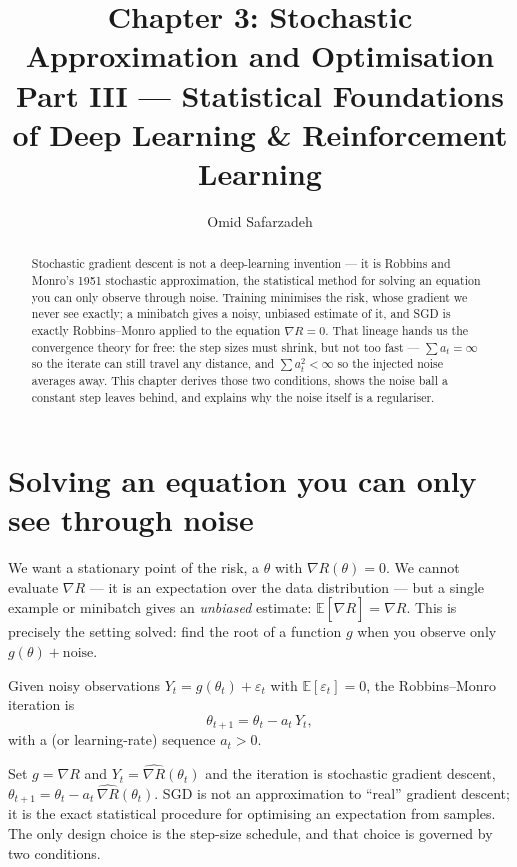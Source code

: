 \documentclass[11pt]{article}
\title{Chapter 3: Stochastic Approximation and Optimisation \\ \large Part III --- Statistical Foundations of Deep Learning \& Reinforcement Learning}
\author{Omid Safarzadeh}
\date{}
\begin{document}
\maketitle

\begin{abstract}
\noindent
Stochastic gradient descent is not a deep-learning invention --- it is Robbins
and Monro's 1951 stochastic approximation, the statistical method for solving an
equation you can only observe through noise. Training minimises the risk, whose
gradient we never see exactly; a minibatch gives a noisy, unbiased estimate of
it, and SGD is exactly Robbins--Monro applied to the equation $\nabla R=0$. That
lineage hands us the convergence theory for free: the step sizes must shrink,
but not too fast --- $\sum a_t=\infty$ so the iterate can still travel any
distance, and $\sum a_t^2<\infty$ so the injected noise averages away. This
chapter derives those two conditions, shows the noise ball a constant step
leaves behind, and explains why the noise itself is a regulariser.
\end{abstract}

\tableofcontents

\section{Solving an equation you can only see through noise}

We want a stationary point of the risk, a $\theta$ with $\nabla R(\theta)=0$.
We cannot evaluate $\nabla R$ --- it is an expectation over the data
distribution --- but a single example or minibatch gives an \emph{unbiased}
estimate: $\mathbb{E}[\widehat{\nabla R}] = \nabla R$. This is precisely the
setting  solved: find the root of a function $g$ when you
observe only $g(\theta)+\text{noise}$.

\begin{definition}
Given noisy observations $Y_t = g(\theta_t) + \varepsilon_t$ with
$\mathbb{E}[\varepsilon_t]=0$, the Robbins--Monro iteration is
\[
  \theta_{t+1} = \theta_t - a_t\, Y_t,
\]
with a  (or learning-rate) sequence $a_t>0$.
\end{definition}

Set $g=\nabla R$ and $Y_t=\widehat{\nabla R}(\theta_t)$ and the iteration is
stochastic gradient descent, $\theta_{t+1}=\theta_t - a_t\,\widehat{\nabla
R}(\theta_t)$. SGD is not an approximation to ``real'' gradient descent; it is
the exact statistical procedure for optimising an expectation from samples. The
only design choice is the step-size schedule, and that choice is governed by two
conditions.
\end{document}
